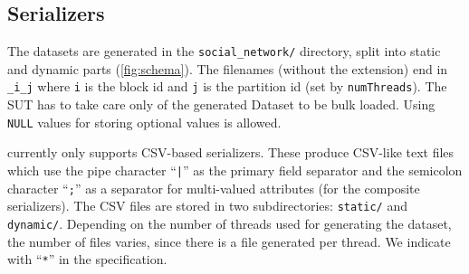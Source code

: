 





\subsection{Serializers}
\label{sec:serializers}

The datasets are generated in the \texttt{social\_network/} directory, split into static and dynamic parts (\autoref{fig:schema}).
The filenames (without the extension) end in \texttt{\_i\_j} where \texttt{i} is the block id and \texttt{j} is the partition id (set by \texttt{numThreads}).
The SUT has to take care only of the generated Dataset to be bulk loaded. Using \texttt{NULL} values for storing optional values is allowed.

\datagen currently only supports CSV-based serializers.
These produce CSV-like text files which use the pipe character ``\texttt{|}'' as the primary field separator and the semicolon character ``\texttt{;}'' as a separator for multi-valued attributes (for the composite serializers).
The CSV files are stored in two subdirectories: \texttt{static/} and \texttt{dynamic/}.
Depending on the number of threads used for generating the dataset, the number of files varies, since there is a file generated per thread. We indicate with ``\texttt{*}'' in the specification.

